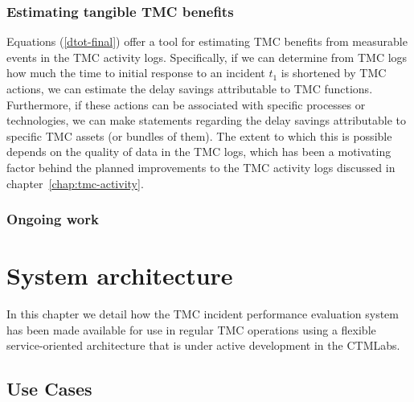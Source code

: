 \documentclass[12pt]{report}
\newcounter{time}
\begin{document}
\subsection{Estimating tangible TMC benefits}
\label{sec:est-benefits}

Equations (\ref{dtot-final}) offer a tool for estimating \ac{TMC} benefits
from measurable events in the \ac{TMC} activity logs.  Specifically, if we
can determine from \ac{TMC} logs how much the time to initial response to
an incident $t_1$ is shortened by \ac{TMC} actions, we can estimate the
delay savings attributable to \ac{TMC} functions.  Furthermore, if these
actions can be associated with specific processes or technologies, we
can make statements regarding the delay savings attributable to
specific \ac{TMC} assets (or bundles of them). The extent to which this is
possible depends on the quality of data in the \ac{TMC} logs, which has
been a motivating factor behind the planned improvements to the \ac{TMC}
activity logs discussed in chapter~\ref{chap:tmc-activity}.


\subsection{Ongoing work}
\label{sec:ongoing-work-tmc-impact}




\chapter{System architecture}
\label{sec:system-architecture}


In this chapter we detail how the \ac{TMC} incident performance
evaluation system has been made available for use in regular \ac{TMC}
operations using a flexible service-oriented architecture that is
under active development in the \ac{CTMLabs}.

\section{Use Cases}
\label{sec:use-cases}
\end{document}
